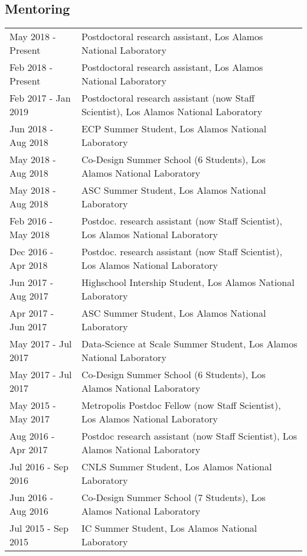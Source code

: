 \documentclass{article}
\begin{document}
\vspace{-2mm}
\subsection*{Mentoring}

\begin{tabular}{p{}p{}}
May 2018 - Present & Postdoctoral research assistant, Los Alamos National Laboratory \\
Feb 2018 - Present & Postdoctoral research assistant, Los Alamos National Laboratory \\
Feb 2017 - Jan 2019 & Postdoctoral research assistant (now Staff Scientist), Los Alamos National Laboratory \\
Jun 2018 - Aug 2018 & ECP Summer Student, Los Alamos National Laboratory \\
May 2018 - Aug 2018 & Co-Design Summer School (6 Students), Los Alamos National Laboratory \\
May 2018 - Aug 2018 & ASC Summer Student, Los Alamos National Laboratory \\
Feb 2016 - May 2018 & Postdoc. research assistant (now Staff Scientist), Los Alamos National Laboratory \\
Dec 2016 - Apr 2018 & Postdoc. research assistant (now Staff Scientist), Los Alamos National Laboratory \\
Jun 2017 - Aug 2017 & Highschool Intership Student, Los Alamos National Laboratory \\
Apr 2017 - Jun 2017 & ASC Summer Student, Los Alamos National Laboratory \\
May 2017 - Jul 2017 & Data-Science at Scale Summer Student, Los Alamos National Laboratory \\
May 2017 - Jul 2017 & Co-Design Summer School (6 Students), Los Alamos National Laboratory \\
May 2015 - May 2017 & Metropolis Postdoc Fellow (now Staff Scientist), Los Alamos National Laboratory \\
Aug 2016 - Apr 2017 & Postdoc research assistant (now Staff Scientist), Los Alamos National Laboratory \\
Jul 2016 - Sep 2016 & CNLS Summer Student, Los Alamos National Laboratory \\
Jun 2016 - Aug 2016 & Co-Design Summer School (7 Students), Los Alamos National Laboratory \\
Jul 2015 - Sep 2015 & IC Summer Student, Los Alamos National Laboratory \\

\end{tabular}
\end{document}
